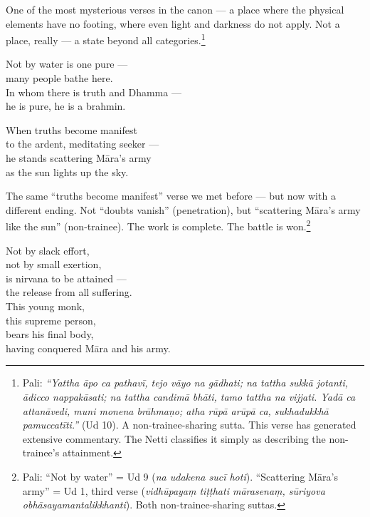 \noindent One of the most mysterious verses in the canon --- a place where the physical elements have no footing, where even light and darkness do not apply. Not a place, really --- a state beyond all categories.\footnote{Pali: \textit{``Yattha āpo ca pathavī, tejo vāyo na gādhati; na tattha sukkā jotanti, ādicco nappakāsati; na tattha candimā bhāti, tamo tattha na vijjati. Yadā ca attanāvedi, muni monena brāhmaṇo; atha rūpā arūpā ca, sukhadukkhā pamuccatīti.''} (Ud 10). A non-trainee-sharing sutta. This verse has generated extensive commentary. The Netti classifies it simply as describing the non-trainee's attainment.}

\begin{versebox}
Not by water is one pure ---\\
many people bathe here.\\
In whom there is truth and Dhamma ---\\
he is pure, he is a brahmin.
\end{versebox}

\begin{versebox}
When truths become manifest\\
to the ardent, meditating seeker ---\\
he stands scattering Māra's army\\
as the sun lights up the sky.
\end{versebox}

\noindent The same ``truths become manifest'' verse we met before --- but now with a different ending. Not ``doubts vanish'' (penetration), but ``scattering Māra's army like the sun'' (non-trainee). The work is complete. The battle is won.\footnote{Pali: ``Not by water'' = Ud 9 (\textit{na udakena sucī hoti}). ``Scattering Māra's army'' = Ud 1, third verse (\textit{vidhūpayaṃ tiṭṭhati mārasenaṃ, sūriyova obhāsayamantalikkhanti}). Both non-trainee-sharing suttas.}

\begin{versebox}
Not by slack effort,\\
not by small exertion,\\
is nirvana to be attained ---\\
the release from all suffering.\\[6pt]
This young monk,\\
this supreme person,\\
bears his final body,\\
having conquered Māra and his army.
\end{versebox}

